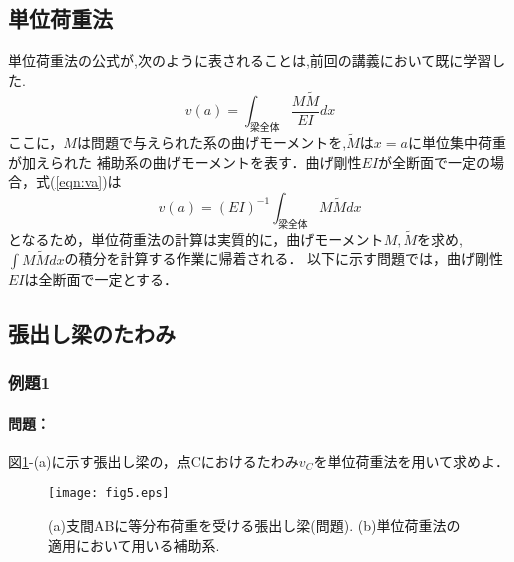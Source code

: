 ﻿\documentclass[10pt,a4j]{jarticle}
\begin{document}
\subsection{単位荷重法}
単位荷重法の公式が,次のように表されることは,前回の講義において既に学習した.
\begin{equation}
	v(a)=\int_{梁全体} \frac{M\tilde M}{EI}dx
	\label{eqn:va}
\end{equation}
ここに，$M$は問題で与えられた系の曲げモーメントを,$\tilde M$は$x=a$に単位集中荷重が加えられた
補助系の曲げモーメントを表す．曲げ剛性$EI$が全断面で一定の場合，式(\ref{eqn:va})は
\begin{equation}
	v(a)=(EI)^{-1}\int_{梁全体} M\tilde Mdx
	\label{eqn:va2}
\end{equation}
となるため，単位荷重法の計算は実質的に，曲げモーメント$M,\tilde M$を求め,
$\int M\tilde M dx$の積分を計算する作業に帰着される．
以下に示す問題では，曲げ剛性$EI$は全断面で一定とする．
\subsection{張出し梁のたわみ}
\subsubsection{例題1}
\paragraph{問題：}
図\ref{fig:fig2_5}-(a)に示す張出し梁の，点Cにおけるたわみ$v_C$を単位荷重法を用いて求めよ．
\begin{figure}[h]
	\begin{center}
	\texttt{[image: fig5.eps]} 
	\end{center}
	\caption{(a)支間ABに等分布荷重を受ける張出し梁(問題).
	 (b)単位荷重法の適用において用いる補助系.} 
	\label{fig:fig2_5}
\end{figure}
\end{document}
